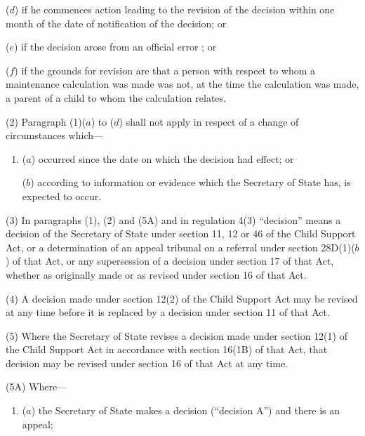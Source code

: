 \documentclass[12pt,a4paper]{article}
\begin{document}
{\begin{enumerate}
($d$) if he commences action leading to the revision of the decision within one month of the date of notification of the decision; or

($e$) if the decision arose from an official error%
%
; or

    ($f$) 
    if the grounds for revision are that a person with respect to whom a maintenance calculation was made was not, at the time the calculation was made, a parent of a child to whom the calculation relates.
\end{enumerate}

(2) Paragraph (1)($a$)  to ($d$)  shall not apply in respect of a change of circumstances which—
\begin{enumerate}\item[]
($a$) occurred since the date on which the decision had effect; or

($b$) according to information or evidence which the Secretary of State has, is expected to occur.
\end{enumerate}


(3) In paragraphs (1), (2) and (5A) and in regulation 4(3) “decision” means a decision of the Secretary of State under section 11, 12 or 46 of the Child Support Act, or a determination of an appeal tribunal on a referral under section 28D(1)($b$)  of that Act, or any supersession of a decision under section 17 of that Act, whether as originally made or as revised under section 16 of that Act.

(4) A decision made under section 12(2) of the Child Support Act may be revised at any time before it is replaced by a decision under section 11 of that Act.

(5) Where the Secretary of State revises a decision made under section 12(1) of the Child Support Act in accordance with section 16(1B) of that Act, that decision may be revised under section 16 of that Act at any time.

(5A) Where—
\begin{enumerate}\item[]
($a$) the Secretary of State makes a decision (“decision A”) and there is an appeal;


\end{enumerate}}
\end{document}
